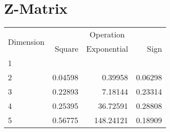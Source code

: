 \documentclass{article}
\begin{document}
\section{Z-Matrix}
\begin{tabular}{@{}lrrr@{}}
\toprule
\multirow{2}{*}{Dimension} & \multicolumn{3}{c}{Operation} \\
\cmidrule(l){2-4}
& Square & Exponential & Sign \\
\midrule
1 & & & \\
2 & 0.04598 & 0.39958 & 0.06298 \\
3 & 0.22893 & 7.18144 & 0.23314 \\
4 & 0.25395 & 36.72591 & 0.28808 \\
5 & 0.56775 & 148.24121 & 0.18909 \\
\bottomrule
\end{tabular}
\end{document}

